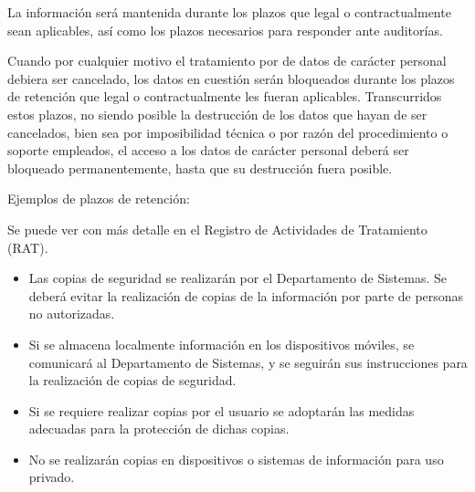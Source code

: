 \begin{enumerate}[label=\alph*)]
    La información será mantenida durante los plazos que legal o contractualmente sean aplicables, así como los plazos necesarios para responder ante auditorías.

    Cuando por cualquier motivo el tratamiento por \Beneficiario{} de datos de carácter personal debiera ser cancelado, los datos en cuestión serán bloqueados durante los plazos de retención que legal o contractualmente les fueran aplicables. Transcurridos estos plazos, no siendo posible la destrucción de los datos que hayan de ser cancelados, bien sea por imposibilidad técnica o por razón del procedimiento o soporte empleados, el acceso a los datos de carácter personal deberá ser bloqueado permanentemente, hasta que su destrucción fuera posible.

    Ejemplos de plazos de retención:


    Se puede ver con más detalle en el Registro de Actividades de Tratamiento (RAT).

    \begin{itemize}
        \item Las copias de seguridad se realizarán por el Departamento de Sistemas. Se deberá evitar la realización de copias de la información por parte de personas no autorizadas.
        \item Si se almacena localmente información en los dispositivos móviles, se comunicará al Departamento de Sistemas, y se seguirán sus instrucciones para la realización de copias de seguridad.
        \item Si se requiere realizar copias por el usuario se adoptarán las medidas adecuadas para la protección de dichas copias.
        \item No se realizarán copias en dispositivos o sistemas de información para uso privado.
    \end{itemize}

\end{enumerate}
